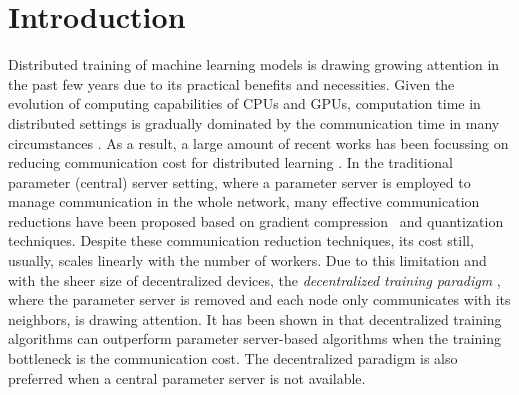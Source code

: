 \documentclass{article} %
\begin{document}
\vspace{-0.15in}
\section{Introduction}
\vspace{-0.05in}

Distributed training of machine learning models is drawing growing attention in the past few years due to its practical benefits and necessities. 
Given the evolution of computing capabilities of CPUs and GPUs, computation time in distributed settings is gradually dominated by the communication time in many circumstances \citep{chilimbi2014project, mcmahan2016communication}. 
As a result, a large amount of recent works has been focussing on reducing communication cost for distributed learning \citep{alistarh2017qsgd,lin2017deep,wangni2018gradient,stich2018sparsified,wang2018atomo,tang2019doublesqueeze}. 
In the traditional parameter (central) server setting, where a parameter server is employed to manage communication in the whole network, many effective communication reductions have been proposed based on gradient compression~\citep{aji2017sparse} and quantization~\citep{chen2010approximate, ge2013optimized,jegou2010product} techniques. 
Despite these communication reduction techniques, its cost still, usually, scales linearly with the number of workers.  
Due to this limitation and with the sheer size of decentralized devices, the \emph{decentralized training paradigm} \citep{duchi2011dual}, where the parameter server is removed and each node only communicates with its neighbors, is drawing attention. 
It has been shown in \citet{lian2017can} that decentralized training algorithms can outperform parameter server-based algorithms when the training bottleneck is the communication cost. 
The decentralized paradigm is also preferred when a central parameter server is not available. 
\end{document}
